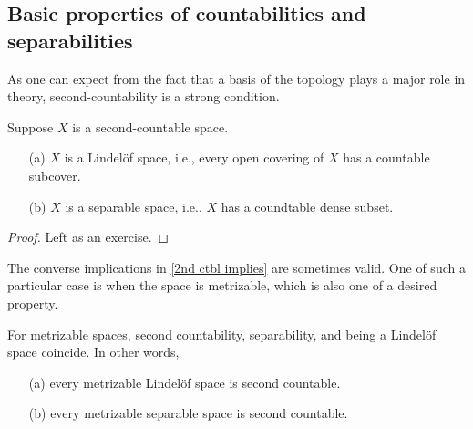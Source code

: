 \subsection{Basic properties of countabilities and separabilities}
As one can expect from the fact that a basis of the topology plays a major role in theory, second-countability is a strong condition.
\begin{prop}\label{2nd ctbl implies}
    Suppose $X$ is a second-countable space.
    \begin{enumerate}
        \item[(a)] $X$ is a Lindel\"{o}f space, i.e., every open covering of $X$ has a countable subcover.
        \item[(b)] $X$ is a separable space, i.e., $X$ has a coundtable dense subset.
    \end{enumerate}
\end{prop}
\begin{proof}
    \color{brown}Left as an exercise.\color{black}
\end{proof}
The converse implications in \cref{2nd ctbl implies} are sometimes valid.
One of such a particular case is when the space is metrizable, which is also one of a desired property.
\begin{prop}
    For metrizable spaces, second countability, separability, and being a Lindel\"{o}f space coincide.
    In other words,
    \begin{enumerate}
        \item[(a)]
        {
            every metrizable Lindel\"{o}f space is second countable.
        }
        \item[(b)]
        {
            every metrizable separable space is second countable.
        }
    \end{enumerate}
\end{prop}
